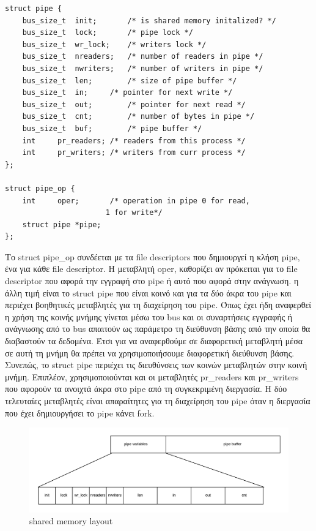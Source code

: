 \begin{lstlisting}
struct pipe {
	bus_size_t	init;		/* is shared memory initalized? */
	bus_size_t	lock;		/* pipe lock */
	bus_size_t	wr_lock;	/* writers lock */
	bus_size_t	nreaders;	/* number of readers in pipe */
	bus_size_t	nwriters;	/* number of writers in pipe */
	bus_size_t	len;		/* size of pipe buffer */
	bus_size_t	in;		/* pointer for next write */
	bus_size_t	out;		/* pointer for next read */
	bus_size_t	cnt;		/* number of bytes in pipe */
	bus_size_t	buf;		/* pipe buffer */
	int		pr_readers;	/* readers from this process */
	int		pr_writers;	/* writers from curr process */
};

struct pipe_op {
	int		oper;		/* operation in pipe 0 for read,
					   1 for write*/
	struct pipe	*pipe;
};
\end{lstlisting}

Το struct pipe\_op συνδέεται με τα file descriptors που δημιουργεί η κλήση pipe,
ένα για κάθε file descriptor. H μεταβλητή oper, καθορίζει αν πρόκειται για το
file descriptor που αφορά την εγγραφή στο pipe ή αυτό που αφορά στην ανάγνωση. η
άλλη τιμή είναι το struct pipe που είναι κοινό και για τα δύο άκρα του pipe και
περιέχει βοηθητικές μεταβλητές για τη διαχείρηση του pipe. Όπως έχει ήδη
αναφερθεί η χρήση της κοινής μνήμης γίνεται μέσω του bus και οι συναρτήσεις
εγγραφής ή ανάγνωσης από το bus απαιτούν ως παράμετρο τη διεύθυνση βάσης από την
οποία θα διαβαστούν τα δεδομένα. Έτσι για να αναφερθούμε σε διαφορετική
μεταβλητή μέσα σε αυτή τη μνήμη θα πρέπει να χρησιμοποιήσουμε διαφορετική
διεύθυνση βάσης. Συνεπώς, το struct pipe περιέχει τις διευθύνσεις των κοινών
μεταβλητών στην κοινή μνήμη. Επιπλέον, χρησιμοποιούνται και οι μεταβλητές
pr\_readers και pr\_writers που αφορούν τα ανοιχτά άκρα στο pipe από τη
συγκεκριμένη διεργασία. Η δύο τελευταίες μεταβλητές είναι απαραίτητες για τη
διαχείρηση του pipe όταν η διεργασία που έχει δημιουργήσει το pipe κάνει fork.

\begin{figure}[htp]
\centering
\includegraphics[scale=0.7]{figures/shared_memoery_layout.png}
\caption{shared memory layout\label{fig4_5}}
\end{figure}

